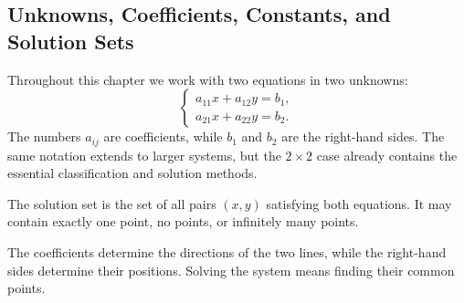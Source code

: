 \subsection{Unknowns, Coefficients, Constants, and Solution Sets}

Throughout this chapter we work with two equations in two unknowns:
\[
\begin{cases}
a_{11}x+a_{12}y=b_1,\\
a_{21}x+a_{22}y=b_2.
\end{cases}
\]
The numbers $a_{ij}$ are coefficients, while $b_1$ and $b_2$ are the right-hand sides. The same notation extends to larger systems, but the $2\times2$ case already contains the essential classification and solution methods.

\begin{definitionbox}
The solution set is the set of all pairs $(x,y)$ satisfying both equations. It may contain exactly one point, no points, or infinitely many points.
\end{definitionbox}

The coefficients determine the directions of the two lines, while the right-hand sides determine their positions. Solving the system means finding their common points.